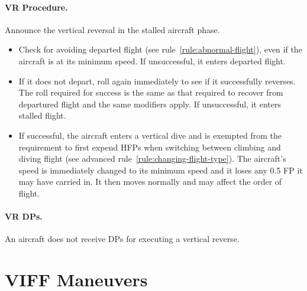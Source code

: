 \begin{advancedrules}
{\paragraph{VR Procedure.} Announce the vertical reversal in the stalled aircraft phase. 

\begin{itemize}

\item Check for avoiding departed flight (see rule~\ref{rule:abnormal-flight}), even if the aircraft is at its minimum speed. If unsuccessful, it enters departed flight. 

\item If it does not depart, roll again immediately to see if it successfully reverses. The roll required for success is the same as that required to recover from departured flight and the same modifiers apply. If unsuccessful, it enters stalled flight.

\item If successful, the aircraft enters a vertical dive and is exempted from the requirement to first expend HFPs when switching between climbing and diving flight (see advanced rule~\ref{rule:changing-flight-type}). The aircraft's speed is immediately changed to its minimum speed and it loses any 0.5 FP it may have carried in. It then moves normally and may affect the order of flight.

\end{itemize}

\paragraph{VR DPs.} An aircraft does not receive DPs for executing a vertical reverse.

}

\section{VIFF Maneuvers}
\label{rule:viff-maneuvers}

\end{advancedrules}
